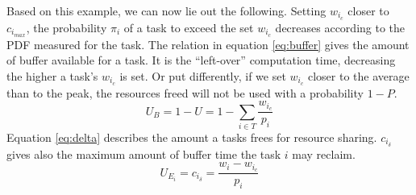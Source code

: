 \documentclass[]{scrartcl}
\begin{document}
Based on this example, we can now lie out the following.
Setting $w_{i_c}$ closer to $c_{i_{max}}$, the probability $\pi_i$ of a task to exceed the set $w_{i_c}$ decreases according to the PDF measured for the task. 
The relation in equation \ref{eq:buffer} gives the amount of buffer available for a task. It is the ``left-over'' computation time, decreasing the higher a task's $w_{i_c}$ is set.
Or put differently, if we set $w_{i_c}$ closer to the average than to the peak, the resources freed will not be used with a probability $1-P$. 
\begin{equation}
	\label{eq:buffer}
	U_B = 1 - U = 1 - \sum_{i \in T} \frac{w_{i_c}}{p_i}
\end{equation}
Equation \ref{eq:delta} describes the amount a tasks frees for resource sharing. $c_{i_\delta}$ gives also the maximum amount of buffer time the task $i$ may reclaim. 
\begin{equation}
	\label{eq:delta}
	U_{E_i} = c_{i_\delta} = \frac{w_{i}- w_{i_c}}{p_i}
\end{equation}
\end{document}
